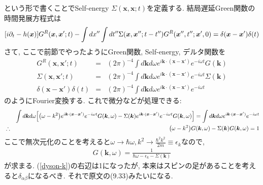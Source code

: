 \documentclass[10.5pt,a4paper]{jreport}
\newcommand{\bx}{\bm{x}}
\newcommand{\bk}{\bm{k}}
\begin{document}
という形で書くことでSelf-energy $\Sigma(\bx, \bx; t)$を定義する. 結局遅延Green関数の時間発展方程式は
\begin{eqnarray}
  \qty[i\partial_t -h(\bx)]G^R(\bx,\bx';t) -\int dx''\int dt''\Sigma(\bx, \bx''; t - t'')G^R(\bx'', t''; \bx', 0)= \delta(\bx-\bx')\delta(t)
\end{eqnarray}
さて, ここで前節でやったようにGreen関数, Self-energy, デルタ関数を
\begin{eqnarray}
  G^R(\bx, \bx';t) &=& (2\pi)^{-4}\int d\bk d\omega e^{i\bk\cdot(\bx-\bx')}e^{-i\omega t}G(\bk)\\
  \Sigma(\bx, \bx';t) &=& (2\pi)^{-4}\int d\bk d\omega e^{i\bk\cdot(\bx-\bx')}e^{-i\omega t}\Sigma(\bk)\\
  \delta(\bx - \bx')\delta(t) &=& (2\pi)^{-4}\int d\bk d\omega e^{i\bk\cdot(\bx - \bx')}e^{-i\omega t}
\end{eqnarray}
のようにFourier変換する. これで微分などが処理できる:
\begin{eqnarray}
\nonumber  &&\int d\bk d\omega \qty[\qty(\omega - k^2)e^{i\bk\cdot(\bx-\bx')}e^{-i\omega t}G(\bk, \omega) - \Sigma(\bk)e^{i\bk\cdot(\bx-\bx')}e^{-i\omega t}G(\bk, \omega)]= \int d\bk d\omega e^{i\bk\cdot(\bx - \bx')}e^{-i\omega t}\\
   &\therefore& \qty(\omega - k^2)G(\bk, \omega) - \Sigma(\bk)G(\bk, \omega)= 1\label{dyson-k}
\end{eqnarray}
ここで無次元化のことを考えると$\omega\rightarrow\hbar\omega, k^2\rightarrow \frac{\hbar^2k^2}{2m}\equiv\epsilon_k$なので,
\begin{eqnarray}
  G(\bk, \omega) = \frac{1}{\hbar\omega - \epsilon_k - \Sigma(\bk)}
\end{eqnarray}
が求まる. (\ref{dyson-k})の右辺は1になったが, 本来はスピンの足があることを考えると$\delta_{\alpha\beta}$になるべき. それで原文の(9.33)みたいになる. 
\end{document}
